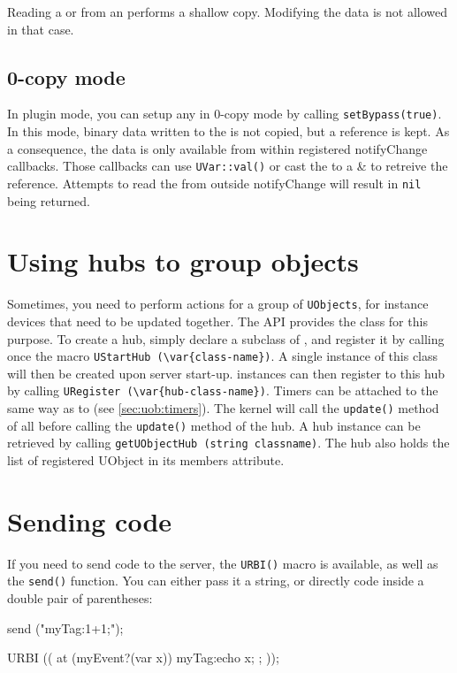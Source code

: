 Reading a \USound or \UImage from an \UVar performs a shallow copy. Modifying
the data is not allowed in that case.

\subsection{0-copy mode}
In plugin mode, you can setup any \UVar in 0-copy mode by calling
\lstinline{setBypass(true)}. In this mode, binary data written to the \UVar
is not copied, but a reference is kept.
As a consequence, the data is only available from within registered
notifyChange callbacks. Those callbacks can use \lstinline|UVar::val()| or
cast the \UVar to a \UBinary\& to retreive the reference.
Attempts to read the \UVar from outside notifyChange will result in
\lstinline{nil} being returned.

\section{Using hubs to group objects}

Sometimes, you need to perform actions for a group of
\lstinline{UObjects}, for instance devices that need to be updated
together. The API provides the \UObjectHub class for this
purpose. To create a hub, simply declare a subclass of
\UObjectHub, and register it by calling once the macro
\lstinline|UStartHub (\var{class-name})|. A single instance of this class
will then be created upon server start-up. \UObject
instances can then register to this hub by calling
\lstinline|URegister (\var{hub-class-name})|. Timers can be attached to
\UObjectHub the same way as to \UObject (see
\autoref{sec:uob:timers}). The kernel will call the \lstinline{update()}
method of all \UObject before calling the
\lstinline{update()} method of the hub. A hub instance can be
retrieved by calling \lstinline{getUObjectHub (string classname)}. The
hub also holds the list of registered UObject in its members
attribute.

\section{Sending \urbi code}

If you need to send \urbi code to the server, the \lstinline{URBI()}
macro is available, as well as the \lstinline{send()} function. You
can either pass it a string, or directly \urbi code inside a double
pair of parentheses:

\begin{urbiunchecked}
send ("myTag:1+1;");

URBI (( at (myEvent?(var x)) { myTag:echo x; }; ));
\end{urbiunchecked}


